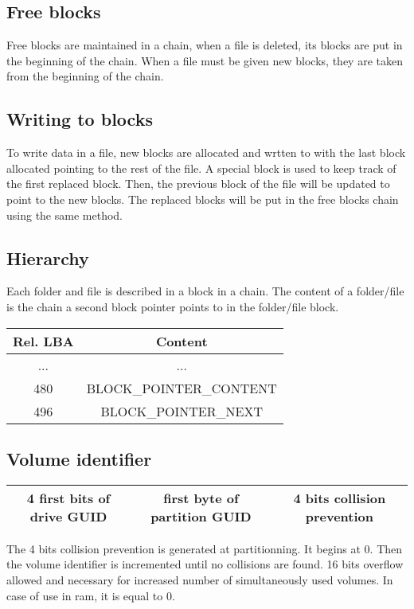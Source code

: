 \documentclass{article}
\begin{document}
\subsection{Free blocks}
Free blocks are maintained in a chain, when a file is deleted, its blocks are put in the beginning of the chain. When a file must be given new blocks, they are taken from the beginning of the chain.
\subsection{Writing to blocks} 
To write data in a file, new blocks are allocated and wrtten to with the last block allocated pointing to the rest of the file. A special block is used to keep track of the first replaced block.
Then, the previous block of the file will be updated to point to the new blocks.
The replaced blocks will be put in the free blocks chain using the same method.

\subsection{Hierarchy}
Each folder and file is described in a block in a chain. The content of a folder/file is the chain a second block pointer points to in the folder/file block.
\newline
\begin{tabular}{|c|c|}
  \hline
  Rel. LBA & Content \\
  \hline
  ... & ...  \\
  \hline
  480 & BLOCK\_POINTER\_CONTENT \\
  \hline
  496 & BLOCK\_POINTER\_NEXT \\
  \hline
\end{tabular}

\subsection{Volume identifier}

\begin{tabular}{|c|c|c|}
  \hline
  4 first bits of drive GUID & first byte of partition GUID & 4 bits collision prevention \\
  \hline
\end{tabular}
\newline
The 4 bits collision prevention is generated at partitionning. It begins at 0. Then the volume identifier is incremented until no collisions are found. 16 bits overflow allowed and necessary for increased number of simultaneously used volumes. In case of use in ram, it is equal to 0.
\end{document}

